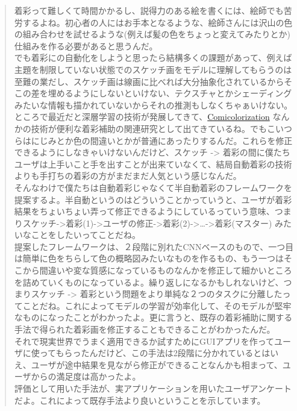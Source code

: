 \documentclass[a4paper, dvipdfmx, 10pt]{article}
\begin{document}
\begin{quote}
着彩って難しくて時間かかるし、説得力のある絵を書くには、絵師でも苦労するよね。初心者の人にはお手本となるような、絵師さんには沢山の色の組み合わせを試せるような(例えば髪の色をちょっと変えてみたりとか)仕組みを作る必要があると思うんだ。\\

でも着彩にの自動化をしようと思ったら結構多くの課題があって、例えば主題を制限していない状態でのスケッチ画をモデルに理解してもらうのは至難の業だし、スケッチ画は線画に比べれば大分抽象化されているからそこの差を埋めるようにしないといけない、テクスチャとかシェーディングみたいな情報も描かれていないからそれの推測もしなくちゃぁいけない。\\

ところで最近だと深層学習の技術が発展してきて、\href{https://nico-opendata.jp/ja/casestudy/comicolorization/index.html}{Comicolorization} なんかの技術が便利な着彩補助の関連研究として出てきているね。でもこいつらはにじみとか色の間違いとかが普通にあったりするんだ。これらを修正できるようにしなきゃいけないんだけど、スケッチ -> 着彩の間に僕たちユーザは上手いこと手を出すことが出来ていなくて、結局自動着彩の技術よりも手打ちの着彩の方がまだまだ人気という感じなんだ。\\

そんなわけで僕たちは自動着彩じゃなくて半自動着彩のフレームワークを提案するよ。半自動というのはどういうことかっていうと、ユーザが着彩結果をちょいちょい弄って修正できるようにしているっていう意味、つまりスケッチ->着彩(1)->ユーザの修正->着彩(2)->\ldots{}->着彩(マスター) みたいなことをしたいってことだね。\\
提案したフレームワークは、２段階に別れたCNNベースのもので、一つ目は簡単に色をちらして色の概略図みたいなものを作るもの、もう一つはそこから間違いや変な質感になっているものなんかを修正して細かいところを詰めていくものになっているよ。繰り返しになるかもしれないけど、つまりスケッチ -> 着彩という問題をより単純な２つのタスクに分離したってことだね。これによってモデルの学習が効率化して、そのモデルが堅牢なものになったことがわかったよ。更に言うと、既存の着彩補助に関する手法で得られた着彩画を修正することもできることがわかったんだ。\\

それで現実世界でうまく適用できるか試すためにGUIアプリを作ってユーザに使ってもらったんだけど、この手法は2段階に分かれているとはいえ、ユーザが途中結果を見ながら修正ができることなんかも相まって、ユーザからの満足度は高かったよ。\\

評価として用いた手法が、実アプリケーションを用いたユーザアンケートだよ。これによって既存手法より良いということを示しています。\\


\end{quote}
\end{document}
